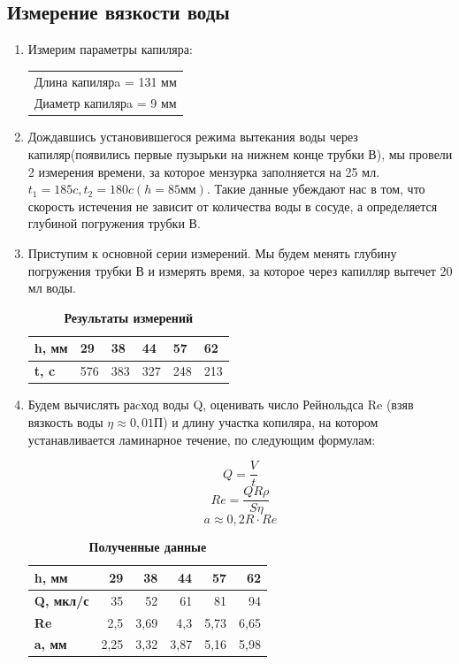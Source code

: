 \documentclass[11pt]{article}
\begin{document}
\subsection{Измерение вязкости воды}
\begin{enumerate}
    \item Измерим параметры капиляра:

    \begin{table}[H]
    \centering
    \begin{tabular}{l}
    Длина капилярa = 131 мм \\
    Диаметр капилярa = 9 мм
    \end{tabular}
    \end{table}


    \item Дождавшись установившегося режима вытекания воды через капиляр(появились первые пузырьки на нижнем конце трубки В), мы провели 2 измерения времени, за которое мензурка заполняется на 25 мл. $t_1 = 185c, t_2 = 180c (h = 85мм)$. Такие данные убеждают нас в том, что скорость истечения не зависит от количества воды в сосуде, а определяется глубиной погружения трубки В.

    \item Приступим к основной серии измерений. Мы будем менять глубину погружения трубки В и измерять время, за которое через капилляр вытечет 20 мл воды.

    \begin{table}[H]
    \centering
    \caption{\textbf{Результаты измерений}}
    \begin{tabular}{|l|l|l|l|l|l|}
    \hline
    \textbf{h,  мм} & 29  & 38  & 44  & 57  & 62  \\ \hline
    \textbf{t, c}   & 576 & 383 & 327 & 248 & 213 \\ \hline
    \end{tabular}
    \end{table}

    \item Будем вычислять раcход воды Q, оценивать число Рейнольдса Re (взяв вязкость воды $\eta \approx 0,01 П$) и длину участка копиляра, на котором устанавливается ламинарное течение, по следующим формулам: 

    \[ Q = \frac{V}{t}\]
    \[ Re = \frac{ Q R \rho }{S \eta}\]
    \[ a \approx 0,2 R \cdot Re \]


    \begin{table}[H]
    \centering
    \caption{\textbf{Полученные данные}}
    \begin{tabular}{|l|r|r|r|r|r|}
    \hline
    \textbf{h, мм}    & 29   & 38   & 44   & 57   & 62   \\ \hline
    \textbf{Q, мкл/с} & 35   & 52   & 61   & 81   & 94   \\ \hline
    \textbf{Re}       & 2,5  & 3,69 & 4,3  & 5,73 & 6,65 \\ \hline
    \textbf{a, мм}    & 2,25 & 3,32 & 3,87 & 5,16 & 5,98 \\ \hline
        \end{tabular}
    \end{table}


\end{enumerate}
\end{document}
